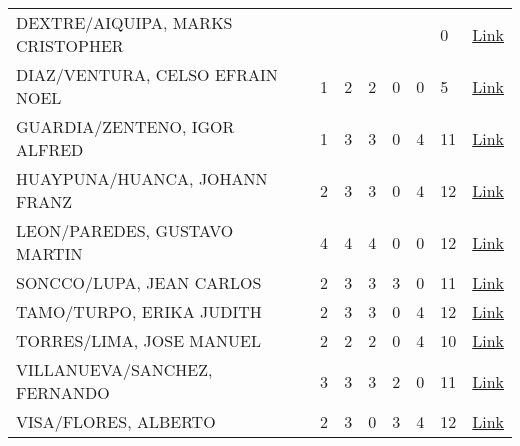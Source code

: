 \begin{table}[hbt!]
\begin{tabular}{llllllll}
		DEXTRE/AIQUIPA, MARKS CRISTOPHER    &             &             &             &             &             & 0             & \href{https://drive.google.com/open?id=1WYgqT2JCTGtzgXqbM5qQqxSmqwJcihF1}{Link}               \\
		DIAZ/VENTURA, CELSO EFRAIN NOEL     & 1           & 2           & 2           & 0           & 0           & 5             & \href{https://drive.google.com/open?id=1WYgqT2JCTGtzgXqbM5qQqxSmqwJcihF1}{Link}               \\
		GUARDIA/ZENTENO, IGOR ALFRED        & 1           & 3           & 3           & 0           & 4           & 11            & \href{https://drive.google.com/open?id=1WYgqT2JCTGtzgXqbM5qQqxSmqwJcihF1}{Link}               \\
		HUAYPUNA/HUANCA, JOHANN FRANZ       & 2           & 3           & 3           & 0           & 4           & 12            & \href{https://drive.google.com/open?id=1WYgqT2JCTGtzgXqbM5qQqxSmqwJcihF1}{Link}               \\
		LEON/PAREDES, GUSTAVO MARTIN        & 4           & 4           & 4           & 0           & 0           & 12            & \href{https://drive.google.com/open?id=1WYgqT2JCTGtzgXqbM5qQqxSmqwJcihF1}{Link}               \\
		SONCCO/LUPA, JEAN CARLOS            & 2           & 3           & 3           & 3           & 0           & 11            & \href{https://drive.google.com/open?id=1WYgqT2JCTGtzgXqbM5qQqxSmqwJcihF1}{Link}               \\
		TAMO/TURPO, ERIKA JUDITH            & 2           & 3           & 3           & 0           & 4           & 12            & \href{https://drive.google.com/open?id=1WYgqT2JCTGtzgXqbM5qQqxSmqwJcihF1}{Link}               \\
		TORRES/LIMA, JOSE MANUEL            & 2           & 2           & 2           & 0           & 4           & 10            & \href{https://drive.google.com/open?id=1WYgqT2JCTGtzgXqbM5qQqxSmqwJcihF1}{Link}               \\
		VILLANUEVA/SANCHEZ, FERNANDO & 3           & 3           & 3           & 2           & 0           & 11            & \href{https://drive.google.com/open?id=1WYgqT2JCTGtzgXqbM5qQqxSmqwJcihF1}{Link}               \\
		VISA/FLORES, ALBERTO                & 2           & 3           & 0           & 3           & 4           & 12            & \href{https://drive.google.com/open?id=1WYgqT2JCTGtzgXqbM5qQqxSmqwJcihF1}{Link}      \\
		\hline        
	\end{tabular}
\end{table}

